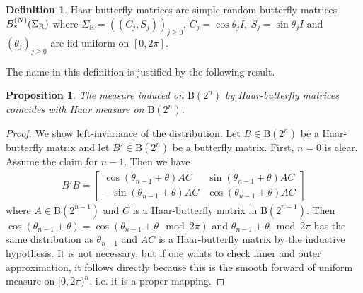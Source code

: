 \documentclass{amsart}
\newtheorem{proposition}{Proposition}[section]
\theoremstyle{definition}
\newtheorem{definition}[theorem]{Definition}
\theoremstyle{remark}
\numberwithin{equation}{section}
\begin{document}
\begin{definition}
Haar-butterfly matrices are simple random butterfly matrices $B_s^{(N)}(\Sigma_{\mathrm{R}})$ where $\Sigma_{\mathrm{R}} = ( (C_j,S_j) )_{j\geq 0}$, $C_j = \cos \theta_j I, ~ S_j = \sin \theta_j I$ and $(\theta_j)_{j \geq 0}$ are iid uniform on $[0, 2\pi]$.  
\end{definition}

The name in this definition is justified by the following result.
\begin{proposition}\label{p:hb}
The measure induced on $\mathrm B(2^n)$ by Haar-butterfly matrices coincides with Haar measure on $\mathrm B(2^n)$.
\end{proposition}
\begin{proof}
We show left-invariance of the distribution.  Let $B \in \mathrm B(2^n)$ be a Haar-butterfly matrix and let $B'\in \mathrm B(2^n)$ be a butterfly matrix. First, $n = 0$ is clear. Assume the claim for $n-1$.  Then we have 
\begin{align}
B' B = \begin{bmatrix} \cos ( \theta_{n-1} + \theta) AC & \sin ( \theta_{n-1} + \theta) AC \\ - \sin ( \theta_{n-1} + \theta) AC & \cos ( \theta_{n-1} + \theta) AC \end{bmatrix}
\end{align}
where $A \in \mathrm B(2^{n-1})$ and $C$ is a Haar-butterfly matrix in $\mathrm B(2^{n-1})$.  Then $\cos ( \theta_{n-1} + \theta) = \cos ( \theta_{n-1} + \theta \mod 2 \pi)$ and $\theta_{n-1} + \theta \mod 2 \pi$ has the same distribution as $\theta_{n-1}$ and $AC$ is a Haar-butterfly matrix by the inductive hypothesis.  It is not necessary, but if one wants to check inner and outer approximation, it follows directly because this is the smooth forward of uniform measure on $[0,2\pi)^n$, i.e. it is a proper mapping.
\end{proof}
\end{document}
